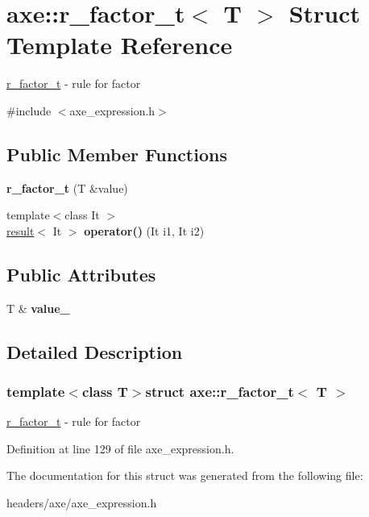 \hypertarget{structaxe_1_1r__factor__t}{\section{axe\+:\+:r\+\_\+factor\+\_\+t$<$ T $>$ Struct Template Reference}
\label{structaxe_1_1r__factor__t}
}


\hyperlink{structaxe_1_1r__factor__t}{r\+\_\+factor\+\_\+t} -\/ rule for factor  




{\ttfamily \#include $<$axe\+\_\+expression.\+h$>$}

\subsection*{Public Member Functions}
\begin{DoxyCompactItemize}
\item 
\hypertarget{structaxe_1_1r__factor__t_a313aa95d7294277e027ea7b6e3ea272d}{{\bfseries r\+\_\+factor\+\_\+t} (T \&value)}\label{structaxe_1_1r__factor__t_a313aa95d7294277e027ea7b6e3ea272d}

\item 
\hypertarget{structaxe_1_1r__factor__t_a0bca36698055e916551d573657d03a24}{{\footnotesize template$<$class It $>$ }\\\hyperlink{structaxe_1_1result}{result}$<$ It $>$ {\bfseries operator()} (It i1, It i2)}\label{structaxe_1_1r__factor__t_a0bca36698055e916551d573657d03a24}

\end{DoxyCompactItemize}
\subsection*{Public Attributes}
\begin{DoxyCompactItemize}
\item 
\hypertarget{structaxe_1_1r__factor__t_aeadc35cea2a32b3e50336bc49c6bcbc6}{T \& {\bfseries value\+\_\+}}\label{structaxe_1_1r__factor__t_aeadc35cea2a32b3e50336bc49c6bcbc6}

\end{DoxyCompactItemize}


\subsection{Detailed Description}
\subsubsection*{template$<$class T$>$struct axe\+::r\+\_\+factor\+\_\+t$<$ T $>$}

\hyperlink{structaxe_1_1r__factor__t}{r\+\_\+factor\+\_\+t} -\/ rule for factor 

Definition at line 129 of file axe\+\_\+expression.\+h.



The documentation for this struct was generated from the following file\+:\begin{DoxyCompactItemize}
\item 
headers/axe/axe\+\_\+expression.\+h\end{DoxyCompactItemize}
